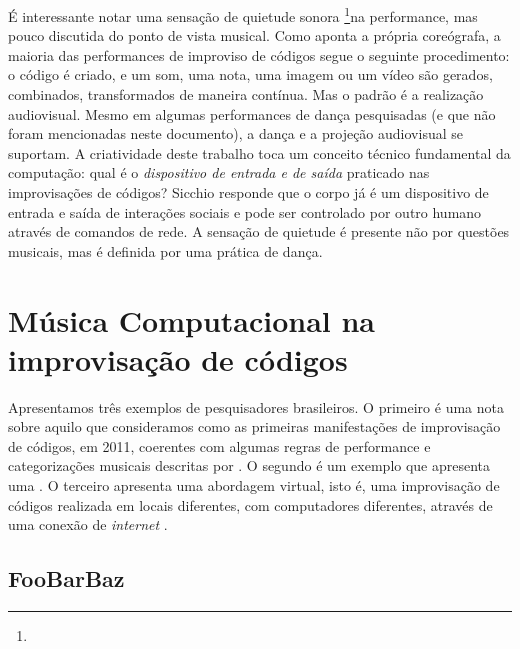 É interessante notar uma sensação de quietude sonora \footnote{}na performance, mas pouco discutida do ponto de vista musical. Como aponta a própria coreógrafa, a maioria das performances de improviso de códigos segue o seguinte procedimento: o código é criado, e um som, uma nota, uma imagem ou um vídeo são gerados, combinados, transformados de maneira contínua. Mas o padrão é a realização audiovisual. Mesmo em algumas performances de dança pesquisadas (e que não foram mencionadas neste documento), a dança e a projeção audiovisual se suportam. A criatividade deste trabalho toca um conceito técnico fundamental da computação: qual é o \emph{dispositivo de entrada e de saída} praticado nas improvisações de códigos? Sicchio responde que o corpo já é um dispositivo de entrada e saída de interações sociais e pode ser controlado por outro humano através de comandos de rede. A sensação de quietude é presente não por questões musicais, mas é definida por uma prática de dança.


\section{Música Computacional na improvisação de códigos}\label{sec:musica}

Apresentamos três exemplos de pesquisadores brasileiros. O primeiro é uma nota sobre aquilo que consideramos como as primeiras manifestações de improvisação de códigos, em 2011, coerentes com algumas regras de performance e categorizações musicais  descritas por . O segundo é um exemplo que apresenta uma \cite[p.~1, ver \protect\autoref{sec:concerto}, p.~\protect\pageref{sec:concerto}]{mclean_tidal_2010}. O terceiro apresenta uma abordagem virtual, isto é, uma improvisação de códigos realizada em locais diferentes, com computadores diferentes, através de uma conexão de \emph{internet} .


\subsection{FooBarBaz}\label{sec:foobarbaz}

